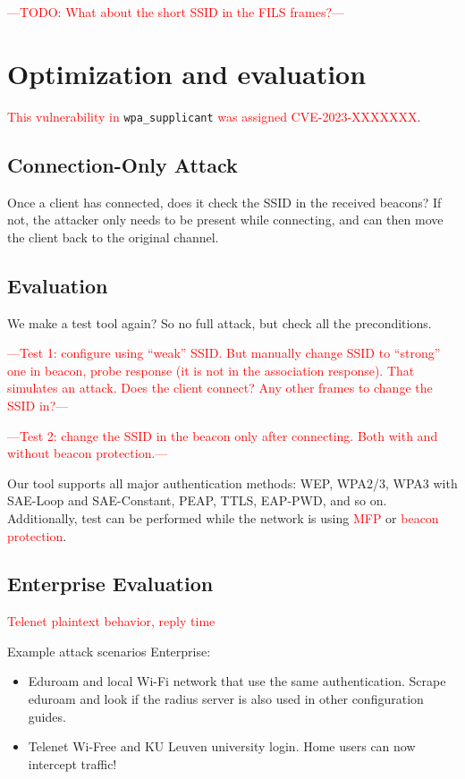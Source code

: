 \documentclass[sigconf,review]{acmart}
\newcommand{\wifi}{\mbox{Wi-Fi}}
\DeclareRobustCommand{\red}[1]{\textcolor{red}{#1}}
\begin{document}
\red{---TODO: What about the short SSID in the FILS frames?---}

\section{Optimization and evaluation}
\label{sec:evaluation}

\red{This vulnerability in} \verb|wpa_supplicant| \red{was assigned CVE-2023-XXXXXXX}.

\subsection{Connection-Only Attack}

Once a client has connected, does it check the SSID in the received beacons?
If not, the attacker only needs to be present while connecting, and can then move the client back to the original channel.

\subsection{Evaluation}

We make a test tool again? So no full attack, but check all the preconditions.

\red{---Test 1: configure using ``weak'' SSID. But manually change SSID to ``strong'' one in beacon, probe response (it is not in the association response). That simulates an attack. Does the client connect? Any other frames to change the SSID in?---}

\red{---Test 2: change the SSID in the beacon only after connecting. Both with and without beacon protection.---}

Our tool supports all major authentication methods: WEP, WPA2/3, WPA3 with SAE-Loop and SAE-Constant, PEAP, TTLS, EAP-PWD, and so on.
Additionally, test can be performed while the network is using \red{MFP} or \red{beacon protection}.

\subsection{Enterprise Evaluation}

\red{Telenet plaintext behavior, reply time}

Example attack scenarios Enterprise:
\begin{itemize}
	\item Eduroam and local \wifi{} network that use the same authentication.
	Scrape eduroam and look if the radius server is also used in other configuration guides.
	\item Telenet Wi-Free and KU Leuven university login.
	Home users can now intercept traffic!
\end{itemize}
\end{document}
